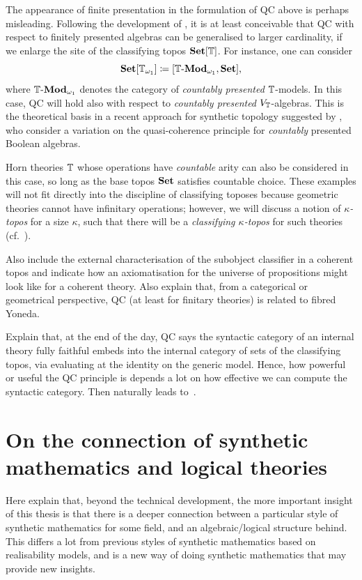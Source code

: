 The appearance of finite presentation in the formulation of \gls{QC} above is perhaps misleading. Following the development of \citet{blechschmidt:2017,blechschmidt_general_2020}, it is at least conceivable that \gls{QC} with respect to finitely presented algebras can be generalised to larger cardinality, if we enlarge the site of the classifying topos $\mathbf{Set}[\mathbb{T}]$. For instance, one can consider
\[ \mathbf{Set}[\mathbb{T}_{\omega_1}] \coloneq [\mathbb{T}\text{-}\mathbf{Mod}_{\omega_1},\mathbf{Set}]\text{,} \]
where $\mathbb{T}\text{-}\mathbf{Mod}_{\omega_1}$ denotes the category of \emph{countably presented} $\mathbb{T}$-models. In this case, \gls{QC} will hold also with respect to \emph{countably presented} $V_{\mathbb{T}}$-algebras. This is the theoretical basis in a recent approach for synthetic topology suggested by \citet{cherubini2024foundation}, who consider a variation on the quasi-coherence principle for \emph{countably} presented Boolean algebras. 

Horn theories $\mathbb{T}$ whose operations have \emph{countable} arity can also be considered in this case, so long as the base topos $\mathbf{Set}$ satisfies countable choice. These examples will not fit directly into the discipline of classifying toposes because geometric theories cannot have infinitary operations; however, we will discuss a notion of \emph{$\kappa$-topos} for a size $\kappa$, such that there will be a \emph{classifying $\kappa$-topos} for such theories (cf.~).

Also include the external characterisation of the subobject classifier in a coherent topos and indicate how an axiomatisation for the universe of propositions might look like for a coherent theory. Also explain that, from a categorical or geometrical perspective, \gls{QC} (at least for finitary theories) is related to fibred Yoneda.

Explain that, at the end of the day, \gls{QC} says the syntactic category of an internal theory fully faithful embeds into the internal category of sets of the classifying topos, via evaluating at the identity on the generic model. Hence, how powerful or useful the \gls{QC} principle is depends a lot on how effective we can compute the syntactic category. Then naturally leads to~.

\section{On the connection of synthetic mathematics and logical theories}\label{sec:logicandmath}

Here explain that, beyond the technical development, the more important insight of this thesis is that there is a deeper connection between a particular style of synthetic mathematics for some field, and an algebraic/logical structure behind. This differs a lot from previous styles of synthetic mathematics based on realisability models, and is a new way of doing synthetic mathematics that may provide new insights. 

